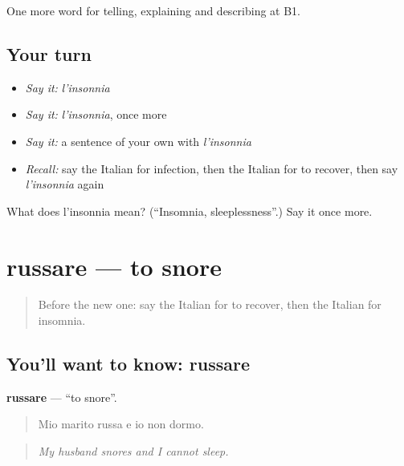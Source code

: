 \begin{grammarlens}[title={What you've built}]
One more word for telling, explaining and describing at B1.
\end{grammarlens}

\subsection*{Your turn}
\begin{itemize}
\raggedright
  \item \emph{Say it:} \emph{l'insonnia}
  \item \emph{Say it:} \emph{l'insonnia}, once more
  \item \emph{Say it:} a sentence of your own with \emph{l'insonnia}
  \item \emph{Recall:} say the Italian for infection, then the Italian for to recover, then say \emph{l'insonnia} again
\end{itemize}

\begin{tcolorbox}[breakable,colback=teal!4,colframe=teal!35!black,title={Before you move on}]
What does l'insonnia mean? (\textquotedblleft{}Insomnia, sleeplessness\textquotedblright{}.) Say it once more.
\end{tcolorbox}
\section[russare]{russare — to snore}

\label{lesson:IT-C490-russare}



\begin{quote}
Before the new one: say the Italian for to recover, then the Italian for insomnia.
\end{quote}

\subsection*{You'll want to know: russare}
\textbf{russare} — \textquotedblleft{}to snore\textquotedblright{}.

\begin{quote}
Mio marito russa e io non dormo.
\end{quote}

\begin{quote}
\emph{My husband snores and I cannot sleep.}
\end{quote}

